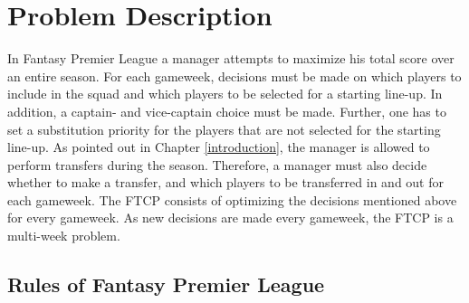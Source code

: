 
\chapter{Problem Description}
In Fantasy Premier League a manager attempts to maximize his total score over an entire season. For each gameweek, decisions must be made on which players to include in the squad and which players to be selected for a starting line-up. In addition, a captain- and vice-captain choice must be made. Further, one has to set a substitution priority for the players that are not selected for the starting line-up. As pointed out in Chapter \ref{introduction}, the manager is allowed to perform transfers during the season. Therefore, a manager must also decide whether to make a transfer, and which players to be transferred in and out for each gameweek.
\newpar
The FTCP consists of optimizing the decisions mentioned above for every gameweek. As new decisions are made every gameweek, the FTCP is a multi-week problem. 

\section{Rules of Fantasy Premier League} \label{rules of fpl}

